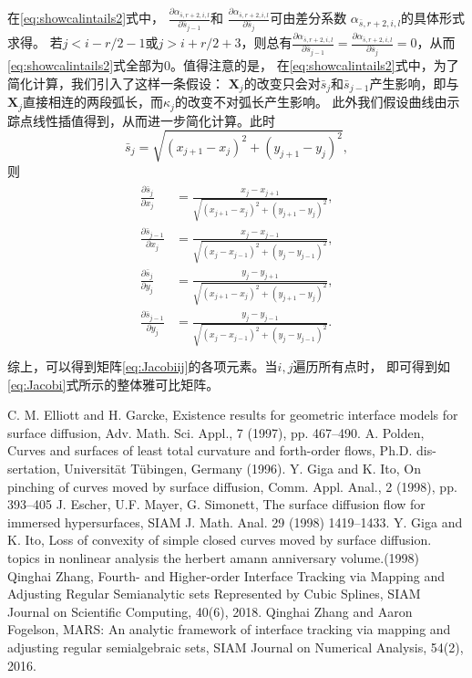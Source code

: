 \documentclass[a4paper,twoside]{ctexart}
\newcommand{\pdfrac}[2]{\frac{\partial #1}{\partial #2}}
\begin{document}
在\eqref{eq:showcalintails2}式中，
$\pdfrac{\alpha_{\bar{s},r+2,i,l}}{\bar{s}_{j-1}}$和
$\pdfrac{\alpha_{\bar{s},r+2,i,l}}{\bar{s}_{j}}$可由差分系数
$\alpha_{\bar{s},r+2,i,l}$的具体形式求得。
若$j < i-r/2-1$或$j >
i+r/2+3$，则总有$\pdfrac{\alpha_{\bar{s},r+2,i,l}}{\bar{s}_{j-1}} =
\pdfrac{\alpha_{\bar{s},r+2,i,l}}{\bar{s}_{j}} = 0$，从而
\eqref{eq:showcalintails2}式全部为0。值得注意的是，
在\eqref{eq:showcalintails2}式中，为了简化计算，我们引入了这样一条假设：
$\boldsymbol X_j$的改变只会对$\bar{s}_{j}$和$\bar{s}_{j-1}$产生影响，即与
$\boldsymbol X_j$直接相连的两段弧长，而$\kappa_j$的改变不对弧长产生影响。
此外我们假设曲线由示踪点线性插值得到，从而进一步简化计算。此时
\begin{equation}
  \label{eq:appos}
  \bar{s}_j = \sqrt{(x_{j+1}-x_j)^2 + (y_{j+1} - y_j)^2},
\end{equation}
则
\begin{eqnarray}
  \label{eq:appods}
  \begin{aligned}
    \pdfrac{\bar{s}_j}{x_j} &= \frac{x_j -
      x_{j+1}}{\sqrt{(x_{j+1}-x_j)^2 + (y_{j+1} - y_j)^2}},\\
    \pdfrac{\bar{s}_{j-1}}{x_j} &= \frac{x_j -
      x_{j-1}}{\sqrt{(x_{j}-x_{j-1})^2 + (y_{j} - y_{j-1})^2}},\\
    \pdfrac{\bar{s}_j}{y_j} &= \frac{y_j -
      y_{j+1}}{\sqrt{(x_{j+1}-x_j)^2 + (y_{j+1} - y_j)^2}},\\
    \pdfrac{\bar{s}_{j-1}}{y_j} &= \frac{y_j -
      y_{j-1}}{\sqrt{(x_{j}-x_{j-1})^2 + (y_{j} - y_{j-1})^2}}.\\
  \end{aligned}
\end{eqnarray}
综上，可以得到矩阵\eqref{eq:Jacobiij}的各项元素。当$i,j$遍历所有点时，
即可得到如\eqref{eq:Jacobi}式所示的整体雅可比矩阵。


\newpage
\begin{thebibliography}{99}  
C. M. Elliott and H. Garcke, Existence results for geometric interface models for surface
diffusion, Adv. Math. Sci. Appl., 7 (1997), pp. 467–490.
A. Polden, Curves and surfaces of least total curvature and forth-order flows, Ph.D. dis-
sertation, Universität Tübingen, Germany (1996).
Y. Giga and K. Ito, On pinching of curves moved by surface diffusion, Comm. Appl. Anal.,
2 (1998), pp. 393–405
J. Escher, U.F. Mayer, G. Simonett, The surface diﬀusion ﬂow for immersed hypersurfaces, SIAM J. Math. Anal. 29 (1998) 1419–1433.
Y. Giga and K. Ito, Loss of convexity of simple closed
  curves moved by surface diffusion. topics in nonlinear analysis the
  herbert amann anniversary volume.(1998)
Qinghai Zhang, Fourth- and Higher-order Interface Tracking via Mapping and Adjusting Regular Semianalytic sets Represented by Cubic Splines, SIAM Journal on Scientific Computing, 40(6), 2018.
Qinghai Zhang and Aaron Fogelson, MARS: An analytic framework of interface tracking via mapping and adjusting regular semialgebraic sets, SIAM Journal on Numerical Analysis, 54(2), 2016.

\end{thebibliography}
\end{document}
